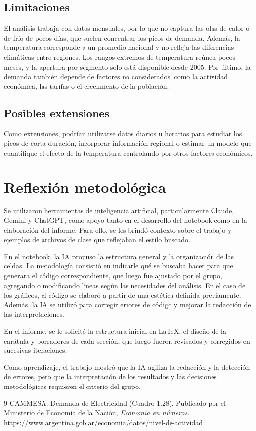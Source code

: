 \documentclass[10pt,a4paper]{article}
\begin{document}
\subsection{Limitaciones}
El análisis trabaja con datos mensuales, por lo que no captura las olas de calor o de frío de pocos días, que suelen concentrar los picos de demanda. Además, la temperatura corresponde a un promedio nacional y no refleja las diferencias climáticas entre regiones. Los rangos extremos de temperatura reúnen pocos meses, y la apertura por segmento solo está disponible desde 2005. Por último, la demanda también depende de factores no considerados, como la actividad económica, las tarifas o el crecimiento de la población.

\subsection{Posibles extensiones}
Como extensiones, podrían utilizarse datos diarios u horarios para estudiar los picos de corta duración, incorporar información regional o estimar un modelo que cuantifique el efecto de la temperatura controlando por otros factores económicos.

\section{Reflexión metodológica}\label{sec:reflexion}
Se utilizaron herramientas de inteligencia artificial, particularmente Claude, Gemini y ChatGPT, como apoyo tanto en el desarrollo del notebook como en la elaboración del informe. Para ello, se les brindó contexto sobre el trabajo y ejemplos de archivos de clase que reflejaban el estilo buscado.

En el notebook, la IA propuso la estructura general y la organización de las celdas. La metodología consistió en indicarle qué se buscaba hacer para que generara el código correspondiente, que luego fue ajustado por el grupo, agregando o modificando líneas según las necesidades del análisis. En el caso de los gráficos, el código se elaboró a partir de una estética definida previamente. Además, la IA se utilizó para corregir errores de código y mejorar la redacción de las interpretaciones.

En el informe, se le solicitó la estructura inicial en \LaTeX, el diseño de la carátula y borradores de cada sección, que luego fueron revisados y corregidos en sucesivas iteraciones.

Como aprendizaje, el trabajo mostró que la IA agiliza la redacción y la detección de errores, pero que la interpretación de los resultados y las decisiones metodológicas requieren el criterio del grupo.

\begin{thebibliography}{9}
CAMMESA. Demanda de Electricidad (Cuadro 1.28). Publicado por el Ministerio de Economía de la Nación, \textit{Economía en números}. \url{https://www.argentina.gob.ar/economia/datos/nivel-de-actividad}
\end{thebibliography}
\end{document}
